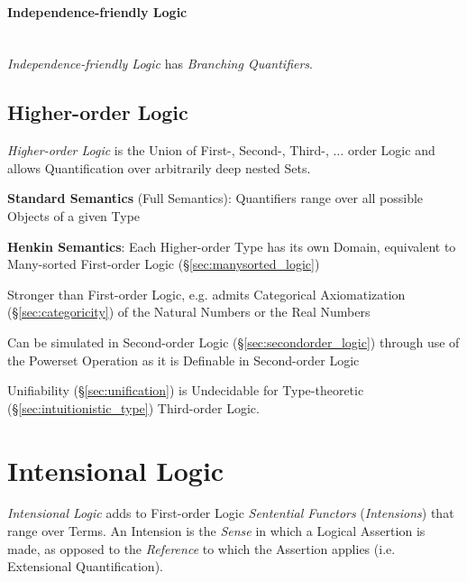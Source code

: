 \paragraph{Independence-friendly
  Logic}\label{sec:independence_logic}\hfill \\

\emph{Independence-friendly Logic} has \emph{Branching Quantifiers}.



\subsection{Higher-order Logic}\label{sec:higherorder_logic}

\emph{Higher-order Logic} is the Union of First-, Second-, Third-,
$\ldots$ order Logic and allows Quantification over arbitrarily deep
nested Sets.

\textbf{Standard Semantics} (Full Semantics): Quantifiers range over all
possible Objects of a given Type

\textbf{Henkin Semantics}: Each Higher-order Type has its own Domain,
equivalent to Many-sorted First-order Logic
(\S\ref{sec:manysorted_logic})

Stronger than First-order Logic, e.g. admits Categorical
Axiomatization (\S\ref{sec:categoricity}) of the Natural Numbers or
the Real Numbers

Can be simulated in Second-order Logic (\S\ref{sec:secondorder_logic})
through use of the Powerset Operation as it is Definable in
Second-order Logic

Unifiability (\S\ref{sec:unification}) is Undecidable for
Type-theoretic (\S\ref{sec:intuitionistic_type}) Third-order Logic.



\section{Intensional Logic}\label{sec:intensional_logic}

\emph{Intensional Logic} adds to First-order Logic \emph{Sentential
  Functors} (\emph{Intensions}) that range over Terms. An Intension is
the \emph{Sense} in which a Logical Assertion is made, as opposed to
the \emph{Reference} to which the Assertion applies (i.e. Extensional
Quantification).



